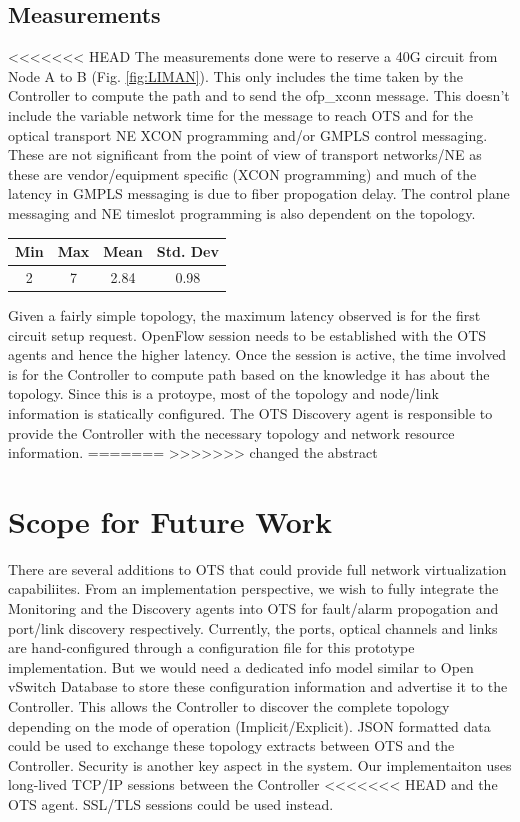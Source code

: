 \documentclass{sig-alternate-10pt}
\begin{document}
	\subsection{Measurements}
	\label{sec:measure}
<<<<<<< HEAD
	The measurements done were to reserve a 40G circuit from Node A to B (Fig. \ref{fig:LIMAN}). This only includes the time 
	taken by the Controller to compute the path and to send the ofp\_xconn message. This doesn't include the variable
	network time for the message to reach OTS and for the optical transport NE XCON programming and/or GMPLS control
	messaging. These are not significant from the point of view of transport networks/NE as these are vendor/equipment
	specific (XCON programming) and much of the latency in GMPLS messaging is due to fiber propogation delay. The control
	plane messaging and NE timeslot programming is also dependent on the topology.

	\begin{center}
		\begin{tabular} { |  c | c | c | c | }
			\hline
			 Min & Max & Mean & Std. Dev \\ \hline
			2	 & 7 & 2.84 & 0.98 \\
			\hline
		\end{tabular}
		\label{tab:measurements}
	\end{center}

	Given a fairly simple topology, the maximum latency observed is for the first circuit setup request. OpenFlow session needs
	to be established with the OTS agents and hence the higher latency. Once the session is active, the time involved is for the
	Controller to compute path based on the knowledge it has about the topology. Since this is a protoype, most of the topology
	and node/link information is statically configured. The OTS Discovery agent is responsible to provide the Controller with the
	necessary topology and network resource information.
=======
>>>>>>> changed the abstract

\section{Scope for Future Work}
\label{sec:future}
	There are several additions to OTS that could provide full network virtualization capabiliites. From an
	implementation perspective, we wish to fully integrate the Monitoring and the Discovery agents into
	OTS for fault/alarm propogation and port/link discovery respectively. Currently, the ports, optical 
	channels and links are hand-configured through a configuration file for this prototype implementation.
	But we would need a dedicated info model similar to Open vSwitch Database \cite{ovsdb} to store
	these configuration information and advertise it to the Controller. This allows the Controller to discover
	the complete topology depending on the mode of operation (Implicit/Explicit). JSON formatted data 
	could be used to exchange these topology extracts between OTS and the Controller. Security is another
	key aspect in the system. Our implementaiton uses long-lived TCP/IP sessions between the Controller
<<<<<<< HEAD
	and the OTS agent. SSL/TLS sessions could be used instead. \\
\end{document}
